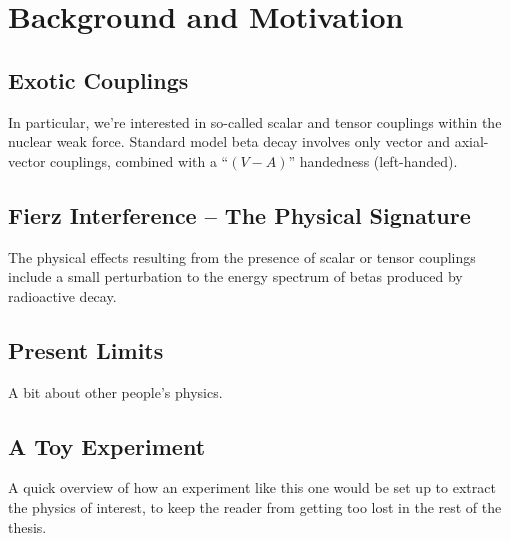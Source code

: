 


\clearpage
\chapter{Background and Motivation}
\label{background_chapter}

\section{Exotic Couplings}
	In particular, we're interested in so-called scalar and tensor couplings within the nuclear weak force. Standard model beta decay involves only vector and axial-vector couplings, combined with a ``$(V-A)$'' handedness (left-handed).  

\section{Fierz Interference -- The Physical Signature}
	The physical effects resulting from the presence of scalar or tensor couplings include a small perturbation to the energy spectrum of betas produced by radioactive decay.  


\section{Present Limits}
	A bit about other people's physics.

\section{A Toy Experiment}
	A quick overview of how an experiment like this one would be set up to extract the physics of interest, to keep the reader from getting too lost in the rest of the thesis.








